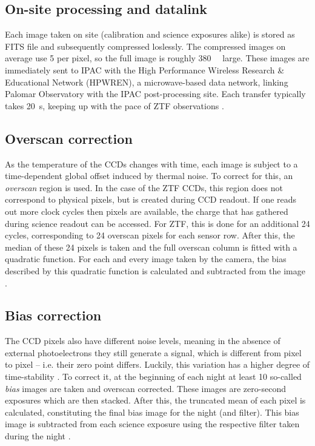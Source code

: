 \subsection{On-site processing and datalink}\label{ztf_data_link}

Each image taken on site (calibration and science exposures alike) is stored as FITS file and subsequently compressed loslessly. The compressed images on average use \SI{5}{\bit} per pixel, so the full image is roughly \SI{380}{\mega\byte} large. These images are immediately sent to IPAC with the High Performance Wireless Research \& Educational Network (HPWREN), a microwave-based data network, linking Palomar Observatory with the IPAC post-processing site. Each transfer typically takes \SI{20}{\second}, keeping up with the pace of ZTF observations \cite{Dekany2020}.

\subsection{Overscan correction}
As the temperature of the CCDs changes with time, each image is subject to a time-dependent global offset induced by thermal noise. To correct for this, an \textit{overscan} region is used. In the case of the ZTF CCDs, this region does not correspond to physical pixels, but is created during CCD readout. If one reads out more clock cycles then pixels are available, the charge that has gathered during science readout can be accessed. For ZTF, this is done for an additional 24 cycles, corresponding to 24 overscan pixels for each sensor row. After this, the median of these 24 pixels is taken and the full overscan column is fitted with a quadratic function. For each and every image taken by the camera, the bias described by this quadratic function is calculated and subtracted from the image \cite{Masci2019a}.

\subsection{Bias correction}
The CCD pixels also have different noise levels, meaning in the absence of external photoelectrons they still generate a signal, which is different from pixel to pixel -- i.e. their zero point differs. Luckily, this variation has a higher degree of time-stability . To correct it, at the beginning of each night at least 10 so-called \textit{bias} images are taken and overscan corrected. These images are zero-second exposures which are then stacked. After this, the truncated mean of each pixel is calculated, constituting the final bias image for the night (and filter). This bias image is subtracted from each science exposure using the respective filter taken during the night \cite{Masci2019a}.

